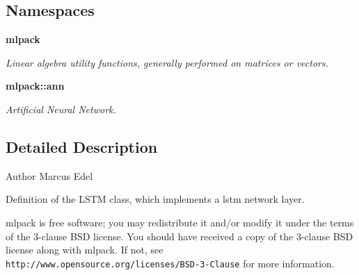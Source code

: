 \subsection*{Namespaces}
\begin{DoxyCompactItemize}
\item 
 {\bf mlpack}
\begin{DoxyCompactList}\small\item\em Linear algebra utility functions, generally performed on matrices or vectors. \end{DoxyCompactList}\item 
 {\bf mlpack\+::ann}
\begin{DoxyCompactList}\small\item\em Artificial Neural Network. \end{DoxyCompactList}\end{DoxyCompactItemize}


\subsection{Detailed Description}
\begin{DoxyAuthor}{Author}
Marcus Edel
\end{DoxyAuthor}
Definition of the L\+S\+TM class, which implements a lstm network layer.

mlpack is free software; you may redistribute it and/or modify it under the terms of the 3-\/clause B\+SD license. You should have received a copy of the 3-\/clause B\+SD license along with mlpack. If not, see {\tt http\+://www.\+opensource.\+org/licenses/\+B\+S\+D-\/3-\/\+Clause} for more information. 